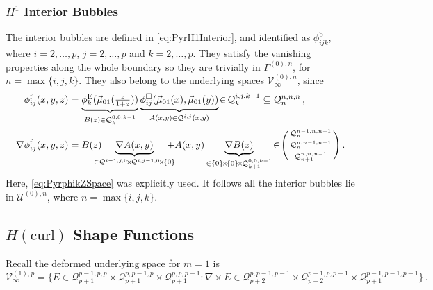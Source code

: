 \subsubsection{\texorpdfstring{$H^1$}{H1} Interior Bubbles}
The interior bubbles are defined in \eqref{eq:PyrH1Interior}, and identified as $\phi_{ijk}^\mathrm{b}$, where $i=2,\ldots,p$, $j=2,\ldots,p$ and $k=2,\ldots,p$.
They satisfy the vanishing properties along the whole boundary so they are trivially in $\Gamma^{(0),n}$, for $n=\max\{i,j,k\}$.
They also belong to the underlying spaces $\mathcal{V}_\infty^{(0),n}$, since
\begin{equation}
\begin{aligned}
	\phi_{ij}^\mathrm{f}(x,y,z)&=
		\underbrace{\phi_k^\E(\vec{\mu}_{01}(\szzz))}_{B(z)\in\mathcal{Q}_k^{0,0,k-1}}
			\underbrace{\phi_{ij}^\square(\vec{\mu}_{01}(x),\vec{\mu}_{01}(y))}_{A(x,y)\in\mathcal{Q}^{i,j}(x,y)}
				\!\in\!\mathcal{Q}_k^{i,j,k-1}\subseteq\mathcal{Q}_n^{n,n,n}\,,\\
	\nabla\phi_{ij}^\mathrm{f}(x,y,z)&=B(z)\!\!\!\!\!\!
		\underbrace{\nabla A(x,y)}_{\in\mathcal{Q}^{i-1,j,0}\!\times\!\mathcal{Q}^{i,j-1,0}\!\times\!\{0\}}\!\!\!\!\!\!
				+A(x,y)\underbrace{\nabla B(z)}_{\in\{0\}\!\times\!\{0\}\!\times\!\mathcal{Q}_{k+1}^{0,0,k-1}}
			\!\in\!\Bigg(\begin{smallmatrix}\mathcal{Q}_n^{n-1,n,n-1}\\[2pt]\mathcal{Q}_n^{n,n-1,n-1}\\[2pt]
				\mathcal{Q}_{n+1}^{n,n,n-1}\end{smallmatrix}\Bigg)\,.
	\label{eq:PyrH1InteriorProof}
\end{aligned}
\end{equation}
Here, \eqref{eq:PyrphikZSpace} was explicitly used.
It follows all the interior bubbles lie in $\mathcal{U}^{(0),n}$, where $n=\max\{i,j,k\}$.


\subsection{\texorpdfstring{$H(\mathrm{curl})$}{Hcurl} Shape Functions}

Recall the deformed underlying space for $m=1$ is
\begin{equation*}
		\mathcal{V}_\infty^{(1),p}=\{E\!\in\!
		\mathcal{Q}_{p+1}^{p-1,p,p}\!\times\!\mathcal{Q}_{p+1}^{p,p-1,p}\!\times\!\mathcal{Q}_{p+1}^{p,p,p-1}:
			\nabla\!\times\! E\!\in\!
				\mathcal{Q}_{p+2}^{p,p-1,p-1}\!\times\!\mathcal{Q}_{p+2}^{p-1,p,p-1}\!\times\!\mathcal{Q}_{p+1}^{p-1,p-1,p-1}\}\,.
\end{equation*}

